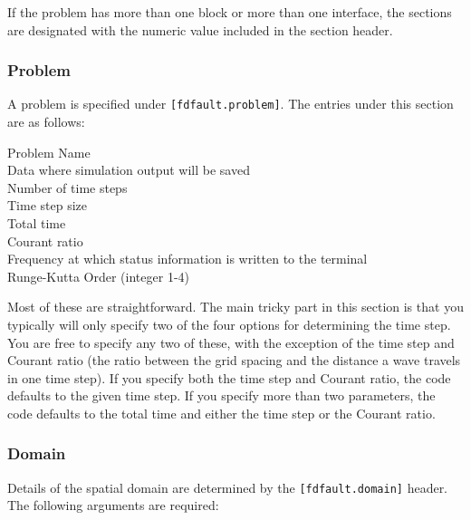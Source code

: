 \documentclass[12pt]{article}   	%
\begin{document}
\vspace{0.1in}
\noindent If the problem has more than one block or more than one interface, the sections are designated with the numeric value included in the section header.

\subsubsection{Problem}

A problem is specified under {\tt [fdfault.problem]}. The entries under this section are as follows:

\vspace{0.1in}
Problem Name \\
\indent Data where simulation output will be saved \\
\indent Number of time steps \\
\indent Time step size \\
\indent Total time \\
\indent Courant ratio \\
\indent Frequency at which status information is written to the terminal \\
\indent Runge-Kutta Order (integer 1-4)

\vspace{0.1in}
\noindent Most of these are straightforward. The main tricky part in this section is that you typically will only specify two of the four options for determining the time step. You are free to specify any two of these, with the exception of the time step and Courant ratio (the ratio between the grid spacing and the distance a wave travels in one time step). If you specify both the time step and Courant ratio, the code defaults to the given time step. If you specify more than two parameters, the code defaults to the total time and either the time step or the Courant ratio.

\subsubsection{Domain}

Details of the spatial domain are determined by the {\tt [fdfault.domain]} header. The following arguments are required:
\end{document}
